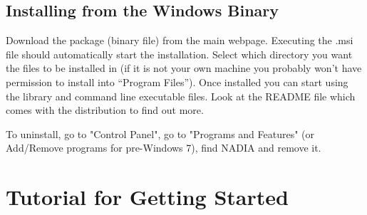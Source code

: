 \documentclass[]{nadia}
\begin{document}
\begin{comment}
--------------------------------------
Change into the example directory:
\begin{myverbatim}
$ cd examples 
\end{myverbatim}
and run one of the examples. e.g.: 
\begin{myverbatim}
$ ./PlanarCDI_example.exe
\end{myverbatim}

If everything is working correcting, you should see some text output
(counting the iterations). If you look at this directory in the
Windows browser you should see that some .ppm image files are created
which give you the reconstruction image for various number of iterations.

Have a look at the code in more detail to see what's going on: 
\begin{myverbatim}
$ xemacs PlanarCDI_example.c 
\end{myverbatim}
and edit some variables to see what happens (e.g.. change the reconstruction algorithm). 
Then recompile and rerun the example: 
\begin{myverbatim}
$ make 
$ ./PlanarCDI_example.exe
\end{myverbatim}
-------------------------
\end{comment}

\subsection{Installing from the Windows Binary}

Download the package (binary file) from the main webpage. Executing
the .msi file should automatically start the installation. Select
which directory you want the files to be installed in (if it is not
your own machine you probably won't have permission to install into
``Program Files''). Once installed you can start using the library and
command line executable files. Look at the README file which comes
with the distribution to find out more. 

To uninstall, go to "Control Panel", go to "Programs and Features" (or Add/Remove programs for pre-Windows 7), find
NADIA and remove it.


\newpage

\section{Tutorial for Getting Started}
\label{getting started}
\end{document}

